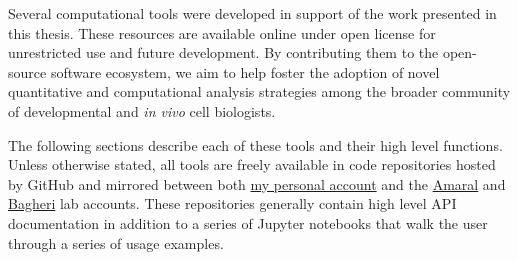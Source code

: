 
Several computational tools were developed in support of the work presented in this thesis. These resources are available online under open license for unrestricted use and future development. By contributing them to the open-source software ecosystem, we aim to help foster the adoption of novel quantitative and computational analysis strategies among the broader community of developmental and \textit{in vivo} cell biologists. 

The following sections describe each of these tools and their high level functions. Unless otherwise stated, all tools are freely available in code repositories hosted by GitHub and mirrored between both \href{https://github.com/sebastianbernasek/}{my personal account} and the \href{https://github.com/amarallab}{Amaral} and \href{https://github.com/bagherilab}{Bagheri} lab accounts. These repositories generally contain high level API documentation in addition to a series of Jupyter notebooks that walk the user through a series of usage examples. 

